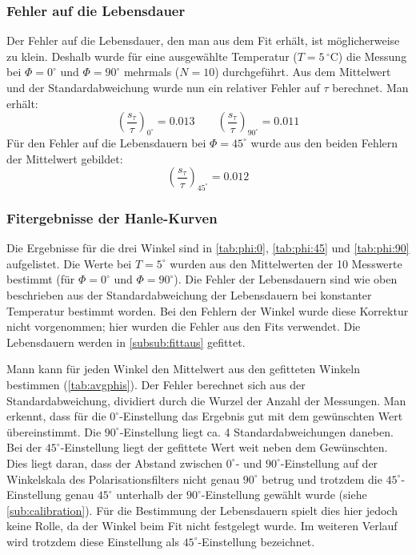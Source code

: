 \subsubsection{Fehler auf die Lebensdauer}
Der Fehler auf die Lebensdauer, den man aus dem Fit erhält, ist möglicherweise zu klein. Deshalb wurde für eine ausgewählte Temperatur ($T=5\,{}^\circ$C) 
die Messung bei $\Phi=0^\circ$ und $\Phi=90^\circ$ mehrmals ($N=10$) durchgeführt. Aus dem Mittelwert und der Standardabweichung wurde 
nun ein relativer Fehler auf $\tau$ berechnet. Man erhält:
\begin{equation}
  \label{eq:error:tau:0_90}
  \left( \frac{s_\tau}{\tau} \right)_{0^\circ} = 0.013 \qquad \left( \frac{s_\tau}{\tau} \right)_{90^\circ} = 0.011
\end{equation}
Für den Fehler auf die Lebensdauern bei $\Phi=45^\circ$ wurde aus den beiden Fehlern der Mittelwert gebildet:
\begin{equation}
  \label{eq:error:tau:45}
  \left( \frac{s_\tau}{\tau} \right)_{45^\circ} = 0.012
\end{equation}
\subsubsection{Fitergebnisse der Hanle-Kurven}
\label{subsub:fitresults}
Die Ergebnisse für die drei Winkel sind in \autoref{tab:phi:0}, \autoref{tab:phi:45} und \autoref{tab:phi:90} aufgelistet. Die Werte bei 
$T=5^\circ$ wurden aus den Mittelwerten der 10 Messwerte bestimmt (für $\Phi=0^\circ$ und $\Phi=90^\circ$).
Die Fehler der 
Lebensdauern sind wie oben beschrieben aus der Standardabweichung der Lebensdauern bei konstanter Temperatur bestimmt worden. Bei den Fehlern 
der Winkel wurde diese Korrektur nicht vorgenommen; hier wurden die Fehler aus den Fits verwendet. Die Lebensdauern werden in 
\ref{subsub:fittaus} gefittet.




Mann kann für jeden Winkel den Mittelwert aus den gefitteten Winkeln bestimmen (\autoref{tab:avgphis}). Der Fehler berechnet sich aus der 
Standardabweichung, dividiert durch die Wurzel der Anzahl der Messungen. Man erkennt, dass für die $0^\circ$-Einstellung das Ergebnis gut mit dem 
gewünschten Wert übereinstimmt. Die $90^\circ$-Einstellung liegt ca. 4 Standardabweichungen daneben. Bei der $45^\circ$-Einstellung liegt der 
gefittete Wert weit neben dem Gewünschten. Dies liegt daran, dass der Abstand zwischen $0^\circ$- und $90^\circ$-Einstellung auf der Winkelskala 
des Polarisationsfilters nicht genau $90^\circ$ betrug und trotzdem die $45^\circ$-Einstellung genau $45^\circ$ unterhalb der $90^\circ$-Einstellung 
gewählt wurde (siehe \ref{sub:calibration}). Für die Bestimmung der Lebensdauern spielt dies hier jedoch keine Rolle, da der Winkel beim Fit 
nicht festgelegt wurde. Im weiteren Verlauf wird trotzdem diese Einstellung als $45^\circ$-Einstellung bezeichnet.



